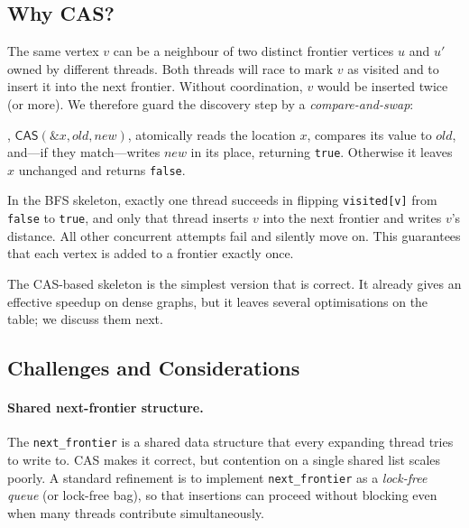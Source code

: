 \subsection{Why CAS?}

The same vertex $v$ can be a neighbour of two distinct frontier
vertices $u$ and $u'$ owned by different threads.  Both threads will
race to mark $v$ as visited and to insert it into the next frontier.
Without coordination, $v$ would be inserted twice (or more).  We
therefore guard the discovery step by a \emph{compare-and-swap}:

\begin{ppdefn}
, $\textsf{CAS}(\&x, \mathit{old}, \mathit{new})$,
atomically reads the location $x$, compares its value to
$\mathit{old}$, and---if they match---writes $\mathit{new}$ in its
place, returning \texttt{true}.  Otherwise it leaves $x$ unchanged and
returns \texttt{false}.
\end{ppdefn}

In the BFS skeleton, exactly one thread succeeds in flipping
\texttt{visited[v]} from \texttt{false} to \texttt{true}, and only that
thread inserts $v$ into the next frontier and writes $v$'s distance.
All other concurrent attempts fail and silently move on.  This
guarantees that each vertex is added to a frontier exactly once.

\begin{ppnote}
The CAS-based skeleton is the simplest version that is correct.  It
already gives an effective speedup on dense graphs, but it leaves
several optimisations on the table; we discuss them next.
\end{ppnote}

\subsection{Challenges and Considerations}

\paragraph{Shared next-frontier structure.}
The \texttt{next\_frontier} is a shared data structure that every
expanding thread tries to write to.  CAS makes it correct, but contention
on a single shared list scales poorly.  A standard refinement is to
implement \texttt{next\_frontier} as a \emph{lock-free queue} (or
lock-free bag), so that insertions can proceed without blocking even
when many threads contribute simultaneously.


